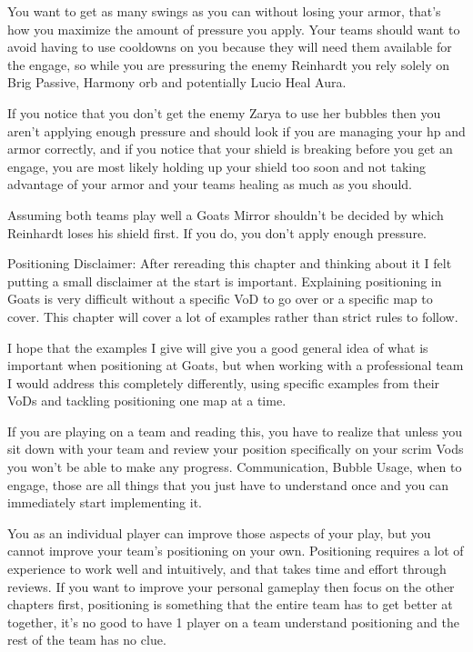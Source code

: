 You want to get as many swings as you can without losing your armor, that’s how you maximize the amount of pressure you apply. Your teams should want to avoid having to use cooldowns on you because they will need them available for the engage, so while you are pressuring the enemy Reinhardt you rely solely on Brig Passive, Harmony orb and potentially Lucio Heal Aura.

If you notice that you don’t get the enemy Zarya to use her bubbles then you aren’t applying enough pressure and should look if you are managing your hp and armor correctly, and if you notice that your shield is breaking before you get an engage, you are most likely holding up your shield too soon and not taking advantage of your armor and your teams healing as much as you should. 

Assuming both teams play well a Goats Mirror shouldn’t be decided by which Reinhardt loses his shield first. If you do, you don’t apply enough pressure. 










Positioning
Disclaimer: After rereading this chapter and thinking about it I felt putting a small disclaimer at the start is important. Explaining positioning in Goats is very difficult without a specific VoD to go over or a specific map to cover. This chapter will cover a lot of examples rather than strict rules to follow.

I hope that the examples I give will give you a good general idea of what is important when positioning at Goats, but when working with a professional team I would address this completely differently, using specific examples from their VoDs and tackling positioning one map at a time.

If you are playing on a team and reading this, you have to realize that unless you sit down with your team and review your position specifically on your scrim Vods you won’t be able to make any progress. Communication, Bubble Usage, when to engage, those are all things that you just have to understand once and you can immediately start implementing it.

You as an individual player can improve those aspects of your play, but you cannot improve your team's positioning on your own. Positioning requires a lot of experience to work well and intuitively, and that takes time and effort through reviews. If you want to improve your personal gameplay then focus on the other chapters first, positioning is something that the entire team has to get better at together, it’s no good to have 1 player on a team understand positioning and the rest of the team has no clue. 





